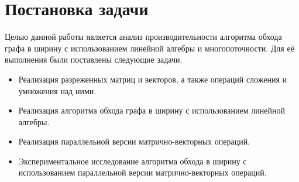 
\section{Постановка задачи}

Целью данной работы является анализ производительности алгоритма обхода графа в ширину с использованием линейной алгебры и многопоточности. Для её выполнения были поставлены следующие задачи.

\begin{itemize}
    \item Реализация разреженных матриц и векторов, а также операций сложения и умножения над ними.
    \item Реализация алгоритма обхода графа в ширину с использованием линейной алгебры.
    \item Реализация параллельной версии матрично-векторных операций.
    \item Экспериментальное исследование алгоритма обхода в ширину с использованием параллельной версии матрично-векторных операций.
\end{itemize}